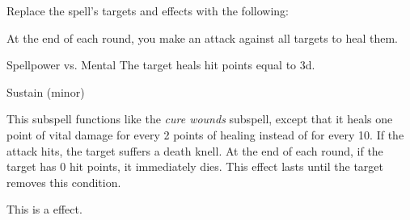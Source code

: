 Replace the spell's targets and effects with the following:
\begin{spellcontent}
\begin{augmenttargetinginfo}
\end{augmenttargetinginfo}
\begin{augmenteffects}
\spelleffect
At the end of each round, you make an attack against all targets to heal them.
\begin{spellattack}{Spellpower vs. Mental}
\spellsuccess
The target heals hit points equal to  \minus3d.
\end{spellattack}
\spelldur Sustain (minor)
\end{augmenteffects}
\end{spellcontent}
This subspell functions like the \textit{cure wounds} subspell, except that it heals one point of vital damage for every 2 points of healing instead of for every 10.
If the attack hits, the target suffers a death knell.
At the end of each round, if the target has 0 hit points, it immediately dies.
This effect lasts until the target removes this condition.
\par
This is a  effect.